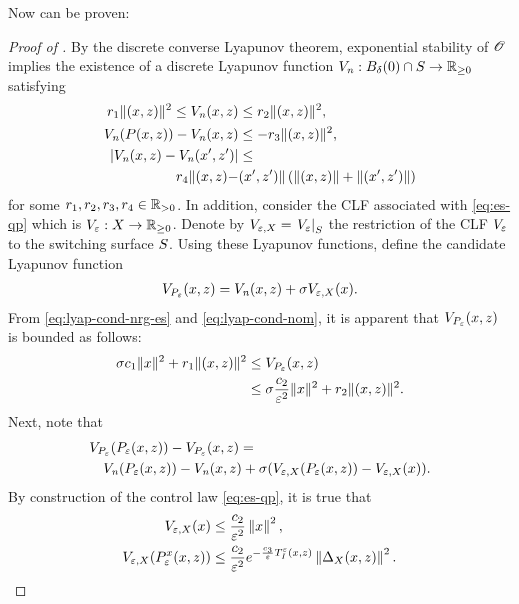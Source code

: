 \documentclass[twocolumn]{article}
\begin{document}
Now  can be proven:
\begin{proof} [Proof of ]
  By the discrete converse Lyapunov theorem, exponential stability of $\Orbit$ implies the existence of a discrete Lyapunov function $\Vn : B_{\delta}(0) \cap \S \to \Rnn$ satisfying
  \begin{align}
    \label{eq:lyap-cond-nom}
    r_{1} \nzdxz^{2} \leq \Vn\argsxz &\leq r_{2} \nzdxz^2,\\
    \nonumber
    \Vn(\P\argsxz) - \Vn\argsxz &\leq -r_{3} \nzdxz^{2},\\
    \nonumber
    | \Vn\argsxz - \Vn(\zdx', \zdz') | &\leq\\
    \nonumber
    r_{4} \| \argsxz - &\argsxzprime \| \left( \nzdxz + \nzdxzprime\right)
  \end{align}
  for some $r_{1}, r_{2}, r_{3}, r_{4} \in \Rpd$.
  In addition, consider the CLF associated with \eqref{eq:es-qp} which is $\Ve : \zdX \to \Rnn$.
  Denote by $\Vex = \VeS$ the restriction of the CLF $\Ve$ to the switching surface $\S$.
  Using these Lyapunov functions, define the candidate Lyapunov function
  \begin{align}
    \VP\argsxz = \Vn\argsxz + \sigma \Vex(\zdx).
  \end{align}
  From \eqref{eq:lyap-cond-nrg-es} and \eqref{eq:lyap-cond-nom}, it is apparent that $\VP\argsxz$ is bounded as follows:
  \begin{align}
    \sigma c_{1} \nzdx^{2} + r_{1} \nzdxz^{2} &\leq \VP\argsxz\\
    \nonumber
    &\leq \sigma \frac{c_{2}}{\resclfparam^{2}} \nzdx^{2} + r_{2} \nzdxz^{2}.
  \end{align}
  Next, note that
  \begin{align}
    \label{eq:composite-lyap}
    \lefteqn{\VP(\Pe\argsxz) - \VP\argsxz =}\\
    \nonumber
      &&\Vn(\Pe\argsxz) - \Vn\argsxz + \sigma(\Vex(\Pe\argsxz) - \Vex(\zdx)).
  \end{align}
  By construction of the control law \eqref{eq:es-qp}, it is true that
  \begin{align}
    \label{eq:Veh-bound}
    \Vex(\zdx) &\leq \frac{c_{2}}{\resclfparam^{2}} \left\| \zdx \right\|^{2},\\
    \nonumber
    \Vex(\Pe^{\zdx}\argsxz) &\leq \frac{c_{2}}{\resclfparam^{2}} e^{-\frac{c_{3}}{\resclfparam} \TIe\argsxz} \left\| \DeltaX\argsxz \right\|^{2}.
  \end{align}

\end{proof}
\end{document}
